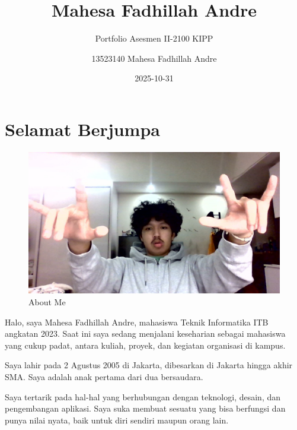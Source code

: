 \documentclass[
  letterpaper,
  DIV=11,
  numbers=noendperiod]{scrreprt}
\title{Mahesa Fadhillah Andre}
\subtitle{Portfolio Asesmen II-2100 KIPP}
\author{13523140 Mahesa Fadhillah Andre}
\date{2025-10-31}
\renewcommand*\contentsname{Table of contents}
\newcommand\contentsname{Table of contents}
\begin{document}
\maketitle

\renewcommand*\contentsname{Table of contents}
{
\hypersetup{linkcolor=}
\setcounter{tocdepth}{2}
\tableofcontents
}


\chapter*{Selamat Berjumpa}\label{selamat-berjumpa}


\begin{figure}[H]

{\centering \includegraphics[width=9.5\linewidth,height=\textheight,keepaspectratio]{images/esa.jpg}

}

\caption{About Me}

\end{figure}%

Halo, saya Mahesa Fadhillah Andre, mahasiswa Teknik Informatika ITB
angkatan 2023. Saat ini saya sedang menjalani keseharian sebagai
mahasiswa yang cukup padat, antara kuliah, proyek, dan kegiatan
organisasi di kampus.

Saya lahir pada 2 Agustus 2005 di Jakarta, dibesarkan di Jakarta hingga
akhir SMA. Saya adalah anak pertama dari dua bersaudara.

Saya tertarik pada hal-hal yang berhubungan dengan teknologi, desain,
dan pengembangan aplikasi. Saya suka membuat sesuatu yang bisa berfungsi
dan punya nilai nyata, baik untuk diri sendiri maupun orang lain.
\end{document}
